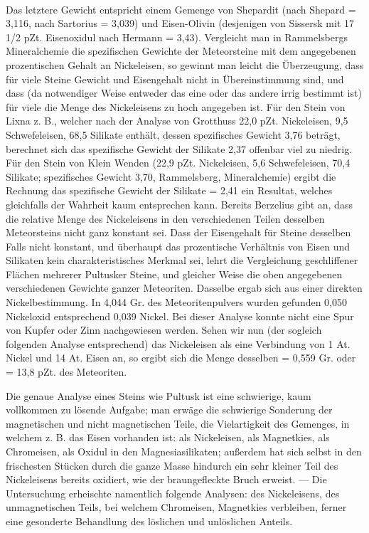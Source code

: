 \documentclass[a4paper, 11pt, oneside, german]{article}
\begin{document}
\paragraph{}
Das letztere Gewicht entspricht einem Gemenge von Shepardit (nach Shepard = 3,116, nach Sartorius = 3,039) und Eisen-Olivin (desjenigen von Sissersk mit 17 1/2 pZt. Eisenoxidul nach Hermann = 3,43). Vergleicht man in Rammelsbergs Mineralchemie die spezifischen Gewichte der Meteorsteine mit dem angegebenen prozentischen Gehalt an Nickeleisen, so gewinnt man leicht die Überzeugung, dass für viele Steine Gewicht und Eisengehalt nicht in Übereinstimmung sind, und dass (da notwendiger Weise entweder das eine oder das andere irrig bestimmt ist) für viele die Menge des Nickeleisens zu hoch angegeben ist. Für den Stein von Lixna z. B., welcher nach der Analyse von Grotthuss 22,0 pZt. Nickeleisen, 9,5 Schwefeleisen, 68,5 Silikate enthält, dessen spezifisches Gewicht 3,76 beträgt, berechnet sich das spezifische Gewicht der Silikate 2,37 offenbar viel zu niedrig. Für den Stein von Klein Wenden (22,9 pZt. Nickeleisen, 5,6 Schwefeleisen, 70,4 Silikate; spezifisches Gewicht 3,70, Rammelsberg, Mineralchemie) ergibt die Rechnung das spezifische Gewicht der Silikate = 2,41 ein Resultat, welches gleichfalls der Wahrheit kaum entsprechen kann. Bereits Berzelius gibt an, dass die relative Menge des Nickeleisens in den verschiedenen Teilen desselben Meteorsteins nicht ganz konstant sei. Dass der Eisengehalt für Steine desselben Falls nicht konstant, und überhaupt das prozentische Verhältnis von Eisen und Silikaten kein charakteristisches Merkmal sei, lehrt die Vergleichung geschliffener Flächen mehrerer Pultusker Steine, und gleicher Weise die oben angegebenen verschiedenen Gewichte ganzer Meteoriten. Dasselbe ergab sich aus einer direkten Nickelbestimmung. In 4,044 Gr. des Meteoritenpulvers wurden gefunden 0,050 Nickeloxid entsprechend 0,039 Nickel. Bei dieser Analyse konnte nicht eine Spur von Kupfer oder Zinn nachgewiesen werden. Sehen wir nun (der sogleich folgenden Analyse entsprechend) das Nickeleisen als eine Verbindung von 1 At. Nickel und 14 At. Eisen an, so ergibt sich die Menge desselben = 0,559 Gr. oder = 13,8 pZt. des Meteoriten.

Die genaue Analyse eines Steins wie Pultusk ist eine schwierige, kaum vollkommen zu lösende Aufgabe; man erwäge die schwierige Sonderung der magnetischen und nicht magnetischen Teile, die Vielartigkeit des Gemenges, in welchem z. B. das Eisen vorhanden ist: als Nickeleisen, als Magnetkies, als Chromeisen, als Oxidul in den Magnesiasilikaten; außerdem hat sich selbst in den frischesten Stücken durch die ganze Masse hindurch ein sehr kleiner Teil des Nickeleisens bereits oxidiert, wie der braungefleckte Bruch erweist. --- Die Untersuchung erheischte namentlich folgende Analysen: des Nickeleisens, des unmagnetischen Teils, bei welchem Chromeisen, Magnetkies verbleiben, ferner eine gesonderte Behandlung des löslichen und unlöslichen Anteils.
\end{document}
